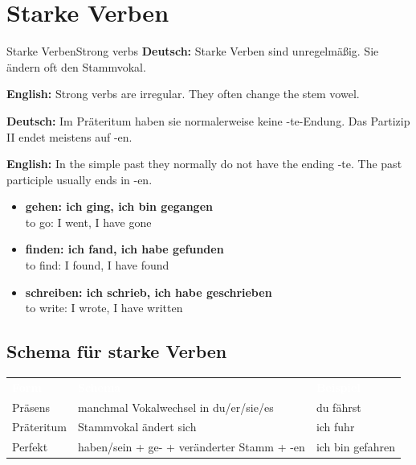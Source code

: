 \documentclass[a4paper,11pt]{article}
\newcommand{\GermanText}[1]{\textbf{Deutsch: }#1\par}
\newcommand{\EnglishText}[1]{{\small\color{SoftGray}\textbf{English: }#1\par}}
\newcommand{\ExampleItem}[2]{\item \textbf{#1}\\{\small\color{SoftGray}#2}}
\begin{document}
    
    \section{Starke Verben}
        
        \begin{grammarentry}{Starke Verben}{Strong verbs}
            \GermanText{Starke Verben sind unregelmäßig. Sie ändern oft den Stammvokal.}
            \EnglishText{Strong verbs are irregular. They often change the stem vowel.}
            
            \GermanText{Im Präteritum haben sie normalerweise keine -te-Endung. Das Partizip II endet meistens auf -en.}
            \EnglishText{In the simple past they normally do not have the ending -te. The past participle usually ends in -en.}
            
            \begin{exbox}
                \begin{itemize}
                    \ExampleItem{gehen: ich ging, ich bin gegangen}{to go: I went, I have gone}
                    \ExampleItem{finden: ich fand, ich habe gefunden}{to find: I found, I have found}
                    \ExampleItem{schreiben: ich schrieb, ich habe geschrieben}{to write: I wrote, I have written}
                \end{itemize}
            \end{exbox}
        \end{grammarentry}
        
        \subsection{Schema für starke Verben}
            
            \begin{tabular}{>{\raggedright\arraybackslash}p{4cm} >{\raggedright\arraybackslash}p{5cm} >{\raggedright\arraybackslash}p{5cm}}
                \rowcolor{HeaderBlueDark}
                \textcolor{white}{\textbf{Form}} &
                \textcolor{white}{\textbf{Schema}} &
                \textcolor{white}{\textbf{Beispiel}} \\
                
                \rowcolor{RowBlueLight}
                Präsens &
                manchmal Vokalwechsel in du/er/sie/es &
                du fährst \\
                
                \rowcolor{RowBlueDark}
                Präteritum &
                Stammvokal ändert sich &
                ich fuhr \\
                
                \rowcolor{RowBlueLight}
                Perfekt &
                haben/sein + ge- + veränderter Stamm + -en &
                ich bin gefahren \\
            \end{tabular}
    
\end{document}
